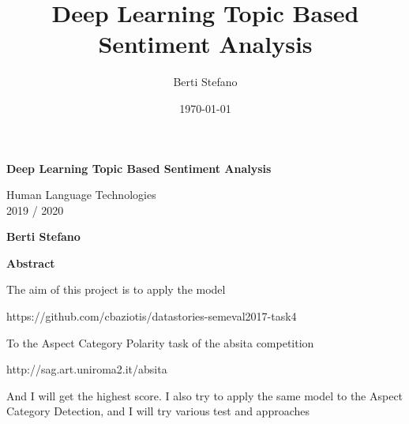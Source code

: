 \documentclass{article}
\title{Deep Learning Topic Based Sentiment Analysis}
\author{Berti Stefano}
\date{\today}
\begin{document}
    \thispagestyle{plain}
    \begin{center}
        \Large
        \textbf{Deep Learning Topic Based Sentiment Analysis}

        \vspace{0.4cm}
        \large Human Language Technologies
        \\2019 / 2020

        \vspace{0.4cm}
        \textbf{Berti Stefano}

        \vspace{0.9cm}
        \textbf{Abstract}
    \end{center}
    The aim of this project is to apply the model
    \\\centerline{https://github.com/cbaziotis/datastories-semeval2017-task4}
    To the Aspect Category Polarity task of the absita competition
    \\\centerline{http://sag.art.uniroma2.it/absita}
    And I will get the highest score.
    I also try to apply the same model to the Aspect Category Detection, and I will try various test and approaches
\end{document}
